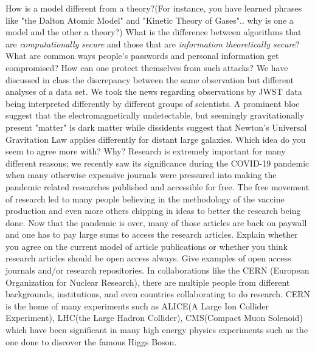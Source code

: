 \documentclass[12pt,addpoints]{exam}
\begin{document}
	\begin{questions}
		\question How is a model different from a theory?(For instance, you have learned phrases like "the Dalton Atomic Model" and "Kinetic Theory of Gases".. why is one a model and the other a theory?)\vspace{2in}
		\question What is the difference between algorithms that are \textit{computationally secure} and those that are \textit{information theoretically secure}?\vspace{2in}
		\question What are common ways people's passwords and personal information get compromised? How can one protect themselves from such attacks?\vspace{2in}
		\question We have discussed in class the discrepancy between the same observation but different analyses of a data set. We took the news regarding observations by JWST data being interpreted differently by different groups of scientists. A prominent bloc suggest that the electromagnetically undetectable, but seemingly gravitationally present "matter" is dark matter while dissidents suggest that Newton's Universal Gravitation Law applies differently for distant large galaxies. Which idea do you seem to agree more with? Why? \vspace{2in}
		\question Research is extremely important for many different reasons; we recently saw its significance during the COVID-19 pandemic when many otherwise expensive journals were pressured into making the pandemic related researches published and accessible for free. The free movement of research led to many people believing in the methodology of the vaccine production and even more others chipping in ideas to better the research being done. Now that the pandemic is over, many of those articles are back on paywall and one has to pay large sums to access the research articles. Explain whether you agree on the current model of article publications or whether you think research articles should be open access always. Give examples of open access journals and/or research repositories. \vspace{3in}
		\question In collaborations like the CERN (European Organization for Nuclear Research), there are multiple people from different backgrounds, institutions, and even countries collaborating to do research. CERN is the home of many experiments such as ALICE(A Large Ion Collider Experiment), LHC(the Large Hadron Collider), CMS(Compact Muon Solenoid) which have been significant in many high energy physics experiments such as the one done to discover the famous Higgs Boson.

\end{questions}
\end{document}
